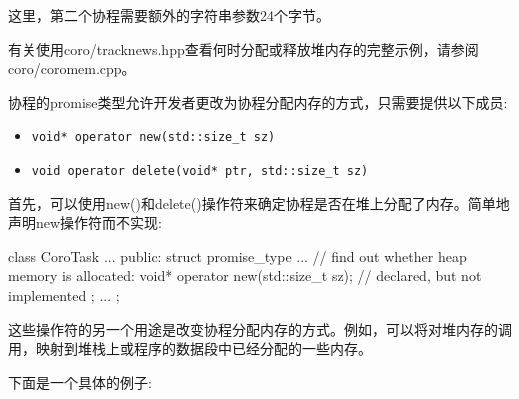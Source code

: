
这里，第二个协程需要额外的字符串参数24个字节。

有关使用coro/tracknews.hpp查看何时分配或释放堆内存的完整示例，请参阅coro/coromem.cpp。


协程的promise类型允许开发者更改为协程分配内存的方式，只需要提供以下成员:

\begin{itemize}
\item
\texttt{void* operator new(std::size\_t sz)}

\item
\texttt{void operator delete(void* ptr, std::size\_t sz)}
\end{itemize}


首先，可以使用new()和delete()操作符来确定协程是否在堆上分配了内存。简单地声明new操作符而不实现:

\begin{cpp}
class CoroTask {
	...
	public:
	struct promise_type {
		...
		// find out whether heap memory is allocated:
		void* operator new(std::size_t sz); // declared, but not implemented
	};
	...
};
\end{cpp}



这些操作符的另一个用途是改变协程分配内存的方式。例如，可以将对堆内存的调用，映射到堆栈上或程序的数据段中已经分配的一些内存。

下面是一个具体的例子:


